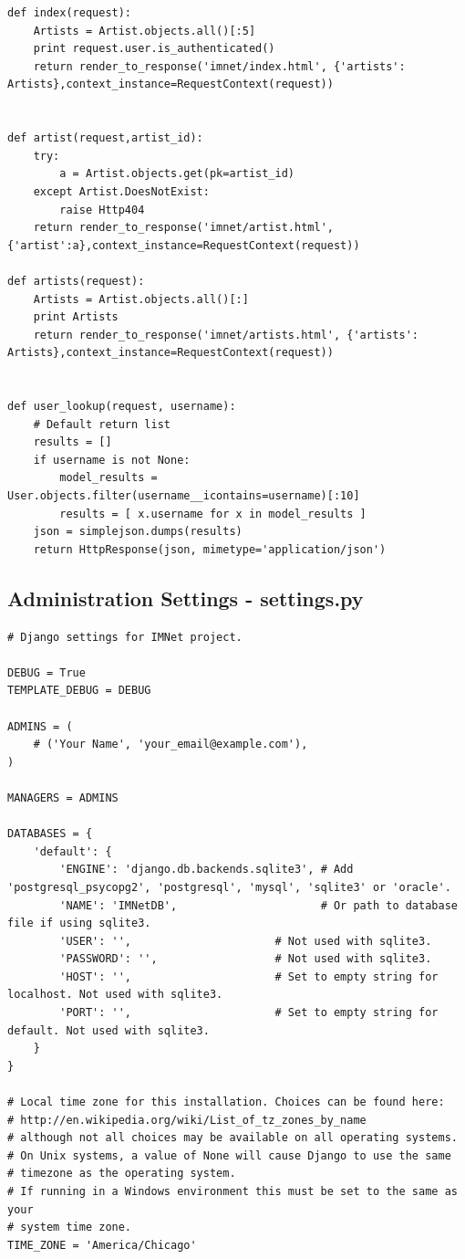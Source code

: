 \documentclass[letterpaper,12pt]{article}
\begin{document}
{\begin{verbatim}
def index(request):
    Artists = Artist.objects.all()[:5]
    print request.user.is_authenticated()
    return render_to_response('imnet/index.html', {'artists': Artists},context_instance=RequestContext(request))


def artist(request,artist_id):
    try:
        a = Artist.objects.get(pk=artist_id)
    except Artist.DoesNotExist:
        raise Http404
    return render_to_response('imnet/artist.html', {'artist':a},context_instance=RequestContext(request))

def artists(request):
    Artists = Artist.objects.all()[:]
    print Artists
    return render_to_response('imnet/artists.html', {'artists': Artists},context_instance=RequestContext(request))


def user_lookup(request, username):
    # Default return list
    results = []
    if username is not None:
        model_results = User.objects.filter(username__icontains=username)[:10]
        results = [ x.username for x in model_results ]
    json = simplejson.dumps(results)
    return HttpResponse(json, mimetype='application/json')
\end{verbatim}

\textcolor{subsection}{\subsection{Administration Settings - settings.py}}
\begin{verbatim}
# Django settings for IMNet project.

DEBUG = True
TEMPLATE_DEBUG = DEBUG

ADMINS = (
    # ('Your Name', 'your_email@example.com'),
)

MANAGERS = ADMINS

DATABASES = {
    'default': {
        'ENGINE': 'django.db.backends.sqlite3', # Add 'postgresql_psycopg2', 'postgresql', 'mysql', 'sqlite3' or 'oracle'.
        'NAME': 'IMNetDB',                      # Or path to database file if using sqlite3.
        'USER': '',                      # Not used with sqlite3.
        'PASSWORD': '',                  # Not used with sqlite3.
        'HOST': '',                      # Set to empty string for localhost. Not used with sqlite3.
        'PORT': '',                      # Set to empty string for default. Not used with sqlite3.
    }
}

# Local time zone for this installation. Choices can be found here:
# http://en.wikipedia.org/wiki/List_of_tz_zones_by_name
# although not all choices may be available on all operating systems.
# On Unix systems, a value of None will cause Django to use the same
# timezone as the operating system.
# If running in a Windows environment this must be set to the same as your
# system time zone.
TIME_ZONE = 'America/Chicago'


\end{verbatim}}
\end{document}
